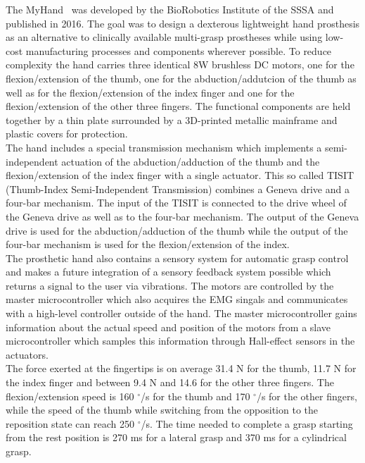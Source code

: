 \documentclass[a4paper, 10pt, conference]{ieeeconf}      %
\begin{document}
The MyHand~\cite{myhand} was developed by the BioRobotics Institute of the SSSA and published in 2016. The goal was to design a dexterous lightweight hand prosthesis as an alternative to clinically available multi-grasp prostheses while using low-cost manufacturing processes and components wherever possible. To reduce complexity the hand carries three identical 8W brushless DC motors, one for the flexion/extension of the thumb, one for the abduction/addutcion of the thumb as well as for the flexion/extension of the index finger and one for the flexion/extension of the other three fingers. The functional components are held together by a thin plate surrounded by a 3D-printed metallic mainframe and plastic covers for protection.\\
The hand includes a special transmission mechanism which implements a semi-independent actuation of the abduction/adduction of the thumb and the flexion/extension of the index finger with a single actuator. This so called TISIT (Thumb-Index Semi-Independent Transmission) combines a Geneva drive and a four-bar mechanism. The input of the TISIT is connected to the drive wheel of the Geneva drive as well as to the four-bar mechanism. The output of the Geneva drive is used for the abduction/adduction of the thumb while the output of the four-bar mechanism is used for the flexion/extension of the index.\\
The prosthetic hand also contains a sensory system for automatic grasp control and makes a future integration of a sensory feedback system possible which returns a signal to the user via vibrations. The motors are controlled by the master microcontroller which also acquires the EMG singals and communicates with a high-level controller outside of the hand. The master microcontroller gains information about the actual speed and position of the motors from a slave microcontroller which samples this information through Hall-effect sensors in the actuators.\\
The force exerted at the fingertips is on average 31.4 N for the thumb, 11.7 N for the index finger and between 9.4 N and 14.6 for the other three fingers. The flexion/extension speed is 160 $^\circ$/s for the thumb and 170 $^\circ$/s for the other fingers, while the speed of the thumb while switching from the opposition to the reposition state can reach 250 $^\circ$/s. The time needed to complete a grasp starting from the rest position is 270 ms for a lateral grasp and 370 ms for a cylindrical grasp.
\end{document}
